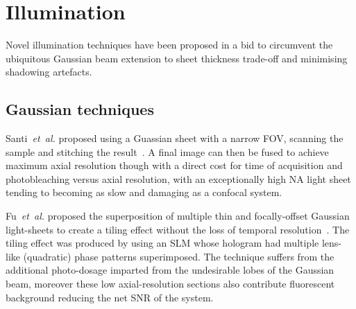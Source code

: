 
\section{Illumination}


Novel illumination techniques have been proposed in a bid to circumvent the ubiquitous Gaussian beam extension to sheet thickness trade-off and minimising shadowing artefacts.

\subsection{Gaussian techniques}

Santi~\emph{et~al.} proposed using a Guassian sheet with a narrow \gls{FOV}, scanning the sample and stitching the result~\cite{santiThinsheetLaserImaging2009}.
A final image can then be fused to achieve maximum axial resolution though with a direct cost for time of acquisition and photobleaching versus axial resolution, with an exceptionally high \gls{NA} light sheet tending to becoming as slow and damaging as a confocal system.

Fu~\emph{et~al.} proposed the superposition of multiple thin and focally-offset Gaussian \gls{light-sheet}s to create a tiling effect without the loss of temporal resolution~\cite{fu_imaging_2016}.
The tiling effect was produced by using an \gls{SLM} whose hologram had multiple lens-like (quadratic) phase patterns superimposed.
The technique suffers from the additional photo-dosage imparted from the undesirable lobes of the Gaussian beam, moreover these low axial-resolution sections also contribute fluorescent background reducing the net \gls{SNR} of the system.

